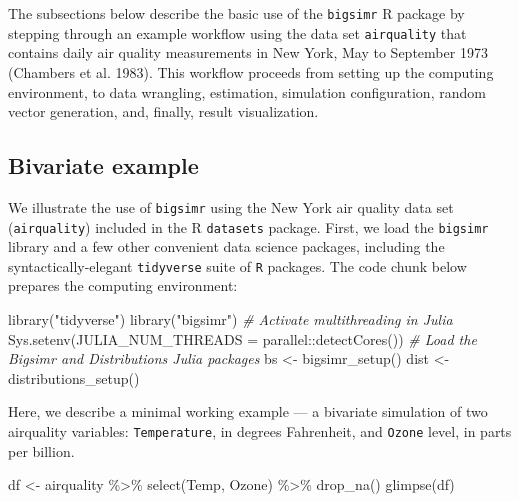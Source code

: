 \documentclass{article}
\newenvironment{Shaded}{\begin{snugshade}}{\end{snugshade}}
\newcommand{\AttributeTok}[1]{\textcolor[rgb]{0.77,0.63,0.00}{#1}}
\newcommand{\CommentTok}[1]{\textcolor[rgb]{0.56,0.35,0.01}{\textit{#1}}}
\newcommand{\FunctionTok}[1]{\textcolor[rgb]{0.00,0.00,0.00}{#1}}
\newcommand{\NormalTok}[1]{#1}
\newcommand{\OtherTok}[1]{\textcolor[rgb]{0.56,0.35,0.01}{#1}}
\newcommand{\SpecialCharTok}[1]{\textcolor[rgb]{0.00,0.00,0.00}{#1}}
\newcommand{\StringTok}[1]{\textcolor[rgb]{0.31,0.60,0.02}{#1}}
\begin{document}
The subsections below describe the basic use of the \texttt{bigsimr} R
package by stepping through an example workflow using the data set
\texttt{airquality} that contains daily air quality measurements in New
York, May to September 1973 (Chambers et al. 1983). This workflow
proceeds from setting up the computing environment, to data wrangling,
estimation, simulation configuration, random vector generation, and,
finally, result visualization.

\hypertarget{bivariate-example}{%
\subsection{Bivariate example}\label{bivariate-example}}

We illustrate the use of \texttt{bigsimr} using the New York air quality
data set (\texttt{airquality}) included in the R \texttt{datasets}
package. First, we load the \texttt{bigsimr} library and a few other
convenient data science packages, including the syntactically-elegant
\texttt{tidyverse} suite of \texttt{R} packages. The code chunk below
prepares the computing environment:

\begin{Shaded}
\begin{Highlighting}[]
\FunctionTok{library}\NormalTok{(}\StringTok{"tidyverse"}\NormalTok{)}
\FunctionTok{library}\NormalTok{(}\StringTok{"bigsimr"}\NormalTok{)}
\CommentTok{\# Activate multithreading in Julia}
\FunctionTok{Sys.setenv}\NormalTok{(}\AttributeTok{JULIA\_NUM\_THREADS =}\NormalTok{ parallel}\SpecialCharTok{::}\FunctionTok{detectCores}\NormalTok{())}
\CommentTok{\# Load the Bigsimr and Distributions Julia packages}
\NormalTok{bs }\OtherTok{\textless{}{-}} \FunctionTok{bigsimr\_setup}\NormalTok{()}
\NormalTok{dist }\OtherTok{\textless{}{-}} \FunctionTok{distributions\_setup}\NormalTok{()}
\end{Highlighting}
\end{Shaded}

Here, we describe a minimal working example --- a bivariate simulation
of two airquality variables: \texttt{Temperature}, in degrees
Fahrenheit, and \texttt{Ozone} level, in parts per billion.

\begin{Shaded}
\begin{Highlighting}[]
\NormalTok{df }\OtherTok{\textless{}{-}}\NormalTok{ airquality }\SpecialCharTok{\%\textgreater{}\%} \FunctionTok{select}\NormalTok{(Temp, Ozone) }\SpecialCharTok{\%\textgreater{}\%} \FunctionTok{drop\_na}\NormalTok{()}
\FunctionTok{glimpse}\NormalTok{(df)}
\end{Highlighting}
\end{Shaded}
\end{document}
